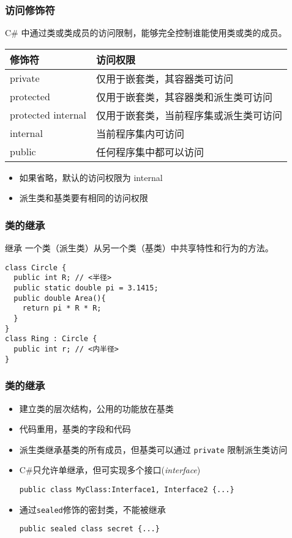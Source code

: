 \begin{frame}
\frametitle{访问修饰符}

{\CJKindent C\# 中通过类或类成员的访问限制，能够完全控制谁能使用类或类的成员。}
\bigskip

\begin{tabular}[tb]{l|l}
  \hline 修饰符      & 访问权限                               \\
  \hline
  private            & 仅用于嵌套类，其容器类可访问           \\
  protected          & 仅用于嵌套类，其容器类和派生类可访问   \\
  protected internal & 仅用于嵌套类，当前程序集或派生类可访问 \\
  internal           & 当前程序集内可访问                     \\
  public             & 任何程序集中都可以访问                 \\
  \hline
\end{tabular}
\bigskip

\begin{itemize}
\item 如果省略，默认的访问权限为 internal
\item 派生类和基类要有相同的访问权限
\end{itemize}
\end{frame}

\begin{frame}[fragile]
\frametitle{类的继承}

  \begin{block}{继承}
    \CJKindent 一个类（派生类）从另一个类（基类）中共享特性和行为的方法。
  \end{block}

\begin{lstlisting}[escapeinside=<>]
class Circle {
  public int R; // <半径>
  public static double pi = 3.1415;
  public double Area(){
    return pi * R * R;
  }
}
class Ring : Circle {
  public int r; // <内半径>
}
\end{lstlisting}
\end{frame}

\begin{frame}[fragile]
\frametitle{类的继承}
  \begin{itemize}
    \setlength{\itemsep}{8pt plus 1pt}
  \item 建立类的层次结构，公用的功能放在基类
  \item 代码重用，基类的字段和代码
  \item 派生类继承基类的所有成员，但基类可以通过 \texttt{private} 限制派生类访问
  \item C\#只允许单继承，但可实现多个接口(\textit{interface})\par
\lstinline|public class MyClass:Interface1, Interface2 {...}|
  \item 通过\texttt{sealed}修饰的密封类，不能被继承\par
\lstinline|public sealed class secret {...}|
  \end{itemize}
\end{frame}

